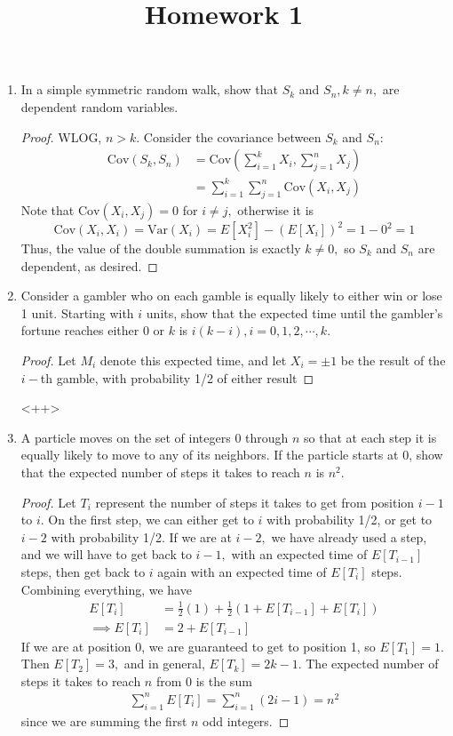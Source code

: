 \documentclass{article}
\newcommand{\var}{\mathrm{Var}}
\newcommand{\cov}{\mathrm{Cov}}
\begin{document}
\title{Homework 1}
\maketitle
\thispagestyle{fancy}

\begin{enumerate}
	\item In a simple symmetric random walk, show that $S_k$ and $S_n, k\neq n,$ are dependent random variables.
		\begin{proof}
			WLOG, $n>k.$ Consider the covariance between $S_k$ and $S_n:$
			\begin{align*}
				\cov(S_k, S_n) &= \cov\left( \sum_{i=1}^{k}X_i, \sum_{j=1}^{n} X_j \right) \\
				&= \sum_{i=1}^{k} \sum_{j=1}^{n} \cov(X_i, X_j)
			\end{align*}
			Note that $\cov(X_i, X_j)=0$ for $i\neq j,$ otherwise it is
			\[\cov(X_i, X_i)=\var(X_i)=E[X_i^2]-(E[X_i])^2 = 1 - 0^2 = 1\]
			Thus, the value of the double summation is exactly $k\neq 0,$ so $S_k$ and $S_n$ are dependent, as desired.
		\end{proof}

	\item Consider a gambler who on each gamble is equally likely to either win or lose 1 unit. Starting with $i$ units, show that the expected time until the gambler's fortune reaches either $0$ or $k$ is $i(k-i), i=0, 1, 2, \cdots, k.$
		\begin{proof}
			Let $M_i$ denote this expected time, and let $X_i=\pm 1$ be the result of the $i-$th gamble, with probability 1/2 of either result
		\end{proof}<++>

	\item A particle moves on the set of integers 0 through $n$ so that at each step it is equally likely to move to any of its neighbors. If the particle starts at 0, show that the expected number of steps it takes to reach $n$ is $n^2.$
		\begin{proof}
			Let $T_i$ represent the number of steps it takes to get from position $i-1$ to $i.$ On the first step, we can either get to $i$ with probability 1/2, or get to $i-2$ with probability 1/2. If we are at $i-2,$ we have already used a step, and we will have to get back to $i-1,$ with an expected time of $E[T_{i-1}]$ steps, then get back to $i$ again with an expected time of $E[T_i]$ steps. Combining everything, we have
			\begin{align*}
				E[T_i] &= \frac{1}{2}(1) + \frac{1}{2}\left( 1+E[T_{i-1}] + E[T_i] \right) \\
				\implies E[T_i] &= 2 + E[T_{i-1}]
			\end{align*}
			If we are at position 0, we are guaranteed to get to position 1, so $E[T_1]=1.$ Then $E[T_2]=3,$ and in general, $E[T_k] = 2k-1.$ The expected number of steps it takes to reach $n$ from 0 is the sum
			\begin{align*}
				\sum_{i=1}^{n}E[T_i] = \sum_{i=1}^{n} (2i-1) = n^2
			\end{align*}
			since we are summing the first $n$ odd integers.
		\end{proof}


\end{enumerate}
\end{document}
